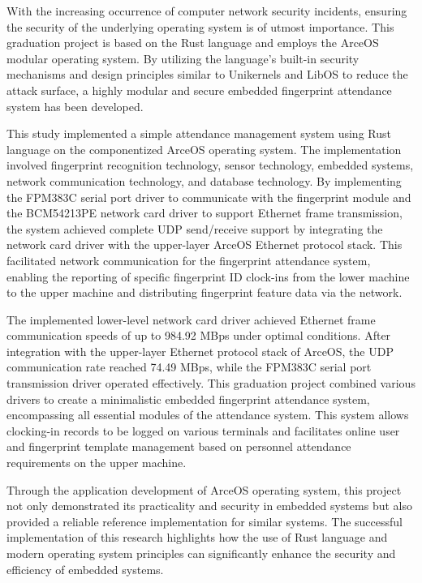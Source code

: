 \documentclass[UTF8,AutoFakeBold=1,AutoFakeSlant,zihao=-4]{scnuthesis}
\begin{document}
\begin{abstractEN}
    With the increasing occurrence of computer network security incidents, 
    ensuring the security of the underlying operating system is of utmost importance. 
    This graduation project is based on the Rust language and employs the ArceOS modular operating system. 
    By utilizing the language's built-in security mechanisms and design principles similar to Unikernels and LibOS to reduce the attack surface,
    a highly modular and secure embedded fingerprint attendance system has been developed.

    This study implemented a simple attendance management system using Rust language on the componentized ArceOS operating system. 
    The implementation involved fingerprint recognition technology, sensor technology, 
    embedded systems, network communication technology, and database technology. 
    By implementing the FPM383C serial port driver to communicate with the fingerprint module and the BCM54213PE network card driver to support Ethernet frame transmission, 
    the system achieved complete UDP send/receive support by integrating the network card driver with the upper-layer ArceOS Ethernet protocol stack. 
    This facilitated network communication for the fingerprint attendance system, enabling the reporting of specific fingerprint ID clock-ins from the lower machine to the upper machine and distributing fingerprint feature data via the network.

    The implemented lower-level network card driver achieved Ethernet frame communication speeds of up to 984.92 MBps under optimal conditions. 
    After integration with the upper-layer Ethernet protocol stack of ArceOS, the UDP communication rate reached 74.49 MBps, while the FPM383C serial port transmission driver operated effectively. This graduation project combined various drivers to create a minimalistic embedded fingerprint attendance system, encompassing all essential modules of the attendance system. This system allows clocking-in records to be logged on various terminals and facilitates online user and fingerprint template management based on personnel attendance requirements on the upper machine.

    Through the application development of ArceOS operating system, this project not only demonstrated its practicality and security in embedded systems but also provided a reliable reference implementation for similar systems. The successful implementation of this research highlights how the use of Rust language and modern operating system principles can significantly enhance the security and efficiency of embedded systems.
\end{abstractEN}
\end{document}
